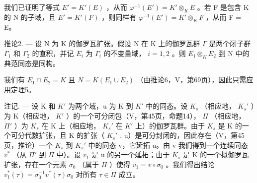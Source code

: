 我们已证明了等式 \(E' = K'(E)\) ，从而 \(\varphi^{-1}(E') = K' \otimes_{K} E\) 。若 F 是包含 K 的 N 的子域，且 \(E' = K'(F)\) ，则同样有 \(\varphi^{-1}(E') = K' \otimes_{K} F\) ，从而 F = E。

推论2. --- 设 N 为 K 的伽罗瓦扩张。假设 N 在 K 上的伽罗瓦群 \(\Gamma\) 是两个闭子群 \(\Gamma_1\) 和 \(\Gamma_2\) 的直积，并记 \(E_i\) 为 \(\Gamma_i\) 的不变量域， \(i = 1, 2\) 。则 \(E_1 \otimes_K E_2\) 到 N 中的典范同态是同构。

我们有 \(E_{1} \cap E_{2} = K\) 且 \(N = K(E_{1} \cup E_{2})\) （由推论6，V，第69页），因此只需应用定理5。

注记. --- 设 K 和 \(K'\) 为两个域，u 为 K 到 \(K'\) 中的同态。设 \(K_s\) （相应地， \(K_s'\) ）为 K（相应地， \(K'\) ）的一个可分闭包（V，第45页，命题14）， \(\Pi\) （相应地， \(\Pi'\) ）为 \(K_s\) 在 K 上（相应地， \(K_s'\) 在 \(K'\) 上）的伽罗瓦群。由于 \(K_s\) 是 K 的一个可分代数扩张，且 K 的扩张（ \(K_s'\) , u）是可分封闭的，因此存在（V，第45页，推论）一个 \(K_s\) 到 \(K_s'\) 中的同态 v，它延拓 u。由 v 我们得到一个连续同态 \(v^*\) （从 \(\Pi'\) 到 \(\Pi\) 中）。设 \(v_1\) 是 u 的另一个延拓；由于 \(K_s\) 是 K 的一个拟伽罗瓦扩张，存在一个元素 \(\sigma_0\) （属于 \(\Pi\) ）使得 \(v_1 = v \circ \sigma_0\) 。我们得出结论 \(v_1^*(\tau) = \sigma_0^{-1} v^*(\tau) \sigma_0\) 对所有 \(\tau \in \Pi\) 成立。

